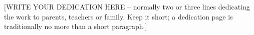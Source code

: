 %

\vspace{1cm}

\begin{center}
\begin{minipage}{0.75\textwidth}
\centering
\itshape

[WRITE YOUR DEDICATION HERE -- normally two or three lines dedicating
the work to parents, teachers or family. Keep it short; a dedication
page is traditionally no more than a short paragraph.]

\end{minipage}
\end{center}

\clearpage
